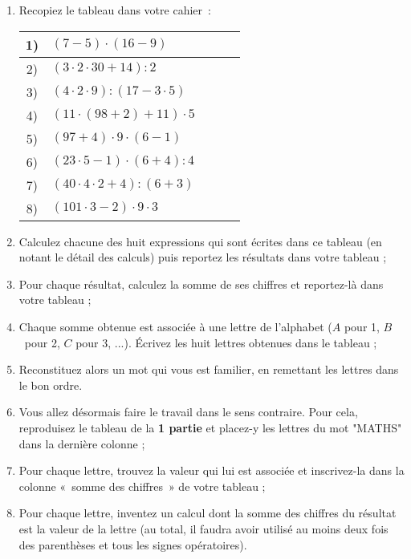 
\begin{TP}


\begin{enumerate}
 \item Recopiez le tableau dans votre cahier :
 
 \begin{center}
 \begin{tabularx}{0.5\linewidth}{|c|X|c|c|c|}
  \hline
  \rowcolor{F3} 1) & $(7 - 5) \cdot (16 - 9)$ & & & \\\hline
  \rowcolor{A2} 2) & $(3 \cdot 2 \cdot 30 + 14) : 2$ & & & \\\hline
  \rowcolor{F3} 3) & $(4 \cdot 2 \cdot 9) : (17 - 3 \cdot 5)$ & & & \\\hline
  \rowcolor{A2} 4) & $(11 \cdot (98 + 2) + 11) \cdot 5$ & & & \\\hline
  \rowcolor{F3} 5) & $(97 + 4) \cdot 9 \cdot (6 - 1)$ & & & \\\hline
  \rowcolor{A2} 6) & $(23 \cdot 5 - 1) \cdot (6 + 4) : 4$ & & & \\\hline
  \rowcolor{F3} 7) & $(40 \cdot 4 \cdot 2 + 4) : (6 + 3)$ & & & \\\hline
  \rowcolor{A2} 8) & $(101 \cdot 3 - 2) \cdot 9 \cdot 3$ & & & \\\hline
  \end{tabularx}
\end{center}

 \item Calculez chacune des huit expressions qui sont écrites dans ce tableau (en notant le détail des calculs) puis reportez les résultats dans votre tableau ;
 \item Pour chaque résultat, calculez la somme de ses chiffres et reportez-là dans votre tableau ;
 \item Chaque somme obtenue est associée à une lettre de l'alphabet ($A$ pour 1, $B$ pour 2, $C$ pour 3, ...). Écrivez les huit lettres obtenues dans le tableau ;
 \item Reconstituez alors un mot qui vous est familier, en remettant les lettres dans le bon ordre.


 \item Vous allez désormais faire le travail dans le sens contraire. Pour cela, reproduisez le tableau de la \textbf{1 partie} et placez-y les lettres du mot "MATHS" dans la dernière colonne ;
 \item Pour chaque lettre, trouvez la valeur qui lui est associée et inscrivez-la dans la colonne « somme des chiffres » de votre tableau ;
 \item Pour chaque lettre, inventez un calcul dont la somme des chiffres du résultat est la valeur de la lettre (au total, il faudra avoir utilisé au moins deux fois des parenthèses et tous les signes opératoires).


\end{enumerate}
\end{TP}
